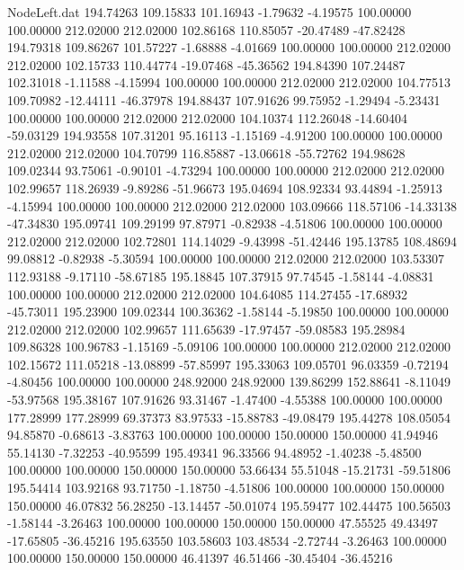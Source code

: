 \begin{filecontents}{NodeLeft.dat}
 194.74263  109.15833  101.16943    -1.79632   -4.19575  100.00000  100.00000  212.02000  212.02000  102.86168  110.85057  -20.47489  -47.82428
 194.79318  109.86267  101.57227    -1.68888   -4.01669  100.00000  100.00000  212.02000  212.02000  102.15733  110.44774  -19.07468  -45.36562
 194.84390  107.24487  102.31018    -1.11588   -4.15994  100.00000  100.00000  212.02000  212.02000  104.77513  109.70982  -12.44111  -46.37978
 194.88437  107.91626   99.75952    -1.29494   -5.23431  100.00000  100.00000  212.02000  212.02000  104.10374  112.26048  -14.60404  -59.03129
 194.93558  107.31201   95.16113    -1.15169   -4.91200  100.00000  100.00000  212.02000  212.02000  104.70799  116.85887  -13.06618  -55.72762
 194.98628  109.02344   93.75061    -0.90101   -4.73294  100.00000  100.00000  212.02000  212.02000  102.99657  118.26939   -9.89286  -51.96673
 195.04694  108.92334   93.44894    -1.25913   -4.15994  100.00000  100.00000  212.02000  212.02000  103.09666  118.57106  -14.33138  -47.34830
 195.09741  109.29199   97.87971    -0.82938   -4.51806  100.00000  100.00000  212.02000  212.02000  102.72801  114.14029   -9.43998  -51.42446
 195.13785  108.48694   99.08812    -0.82938   -5.30594  100.00000  100.00000  212.02000  212.02000  103.53307  112.93188   -9.17110  -58.67185
 195.18845  107.37915   97.74545    -1.58144   -4.08831  100.00000  100.00000  212.02000  212.02000  104.64085  114.27455  -17.68932  -45.73011
 195.23900  109.02344  100.36362    -1.58144   -5.19850  100.00000  100.00000  212.02000  212.02000  102.99657  111.65639  -17.97457  -59.08583
 195.28984  109.86328  100.96783    -1.15169   -5.09106  100.00000  100.00000  212.02000  212.02000  102.15672  111.05218  -13.08899  -57.85997
 195.33063  109.05701   96.03359    -0.72194   -4.80456  100.00000  100.00000  248.92000  248.92000  139.86299  152.88641   -8.11049  -53.97568
 195.38167  107.91626   93.31467    -1.47400   -4.55388  100.00000  100.00000  177.28999  177.28999   69.37373   83.97533  -15.88783  -49.08479
 195.44278  108.05054   94.85870    -0.68613   -3.83763  100.00000  100.00000  150.00000  150.00000   41.94946   55.14130   -7.32253  -40.95599
 195.49341   96.33566   94.48952    -1.40238   -5.48500  100.00000  100.00000  150.00000  150.00000   53.66434   55.51048  -15.21731  -59.51806
 195.54414  103.92168   93.71750    -1.18750   -4.51806  100.00000  100.00000  150.00000  150.00000   46.07832   56.28250  -13.14457  -50.01074
 195.59477  102.44475  100.56503    -1.58144   -3.26463  100.00000  100.00000  150.00000  150.00000   47.55525   49.43497  -17.65805  -36.45216
 195.63550  103.58603  103.48534    -2.72744   -3.26463  100.00000  100.00000  150.00000  150.00000   46.41397   46.51466  -30.45404  -36.45216

\end{filecontents}
